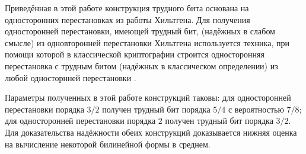 \documentclass[a4paper, 14pt]{extarticle}
\begin{document}
Приведённая в этой работе конструкция трудного бита основана на односторонних
перестановках из работы Хильтгена. Для получения односторонней перестановки,
имеющей трудный бит, (надёжных в слабом смысле) из одновторонней перестановки
Хильтгена используется техника, при помощи которой в классической криптографии
строится односторонняя перестановка с трудным битом (надёжных в классическом
определении) из любой односторнней перестановки \cite{goldreich_levin}.

Параметры полученных в этой работе конструкций таковы: для односторонней
перестановки порядка $3/2$ получен трудный бит порядка $5/4$ с вероятностью
$7/8$; для односторонней перестановки порядка $2$ получен трудный бит порядка
$3/2$. Для доказательства надёжности обеих конструкций доказывается нижняя
оценка на вычисление некоторой билинейной формы в среднем.

{}

\end{document}
